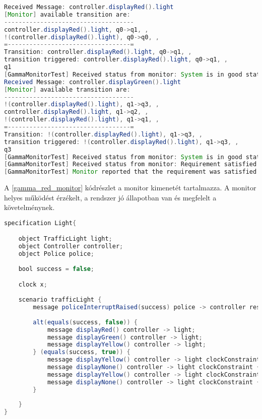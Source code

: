 \begin{lstlisting}[language=java, frame=single, float=ht!, caption={Monitor kimenete.},captionpos=b,label=gamma_red_monitor]
Received Message: controller.displayRed().light
[Monitor] available transition are: 
------------------------------------
controller.displayRed().light, q0->q1, , 
!(controller.displayRed().light), q0->q0, , 
=----------------------------------=
Transition: controller.displayRed().light, q0->q1, , 
transition triggered: controller.displayRed().light, q0->q1, , 
q1
[GammaMonitorTest] Received status from monitor: System is in good state.
Received Message: controller.displayGreen().light
[Monitor] available transition are: 
------------------------------------
!(controller.displayRed().light), q1->q3, , 
controller.displayRed().light, q1->q2, , 
!(controller.displayRed().light), q1->q1, , 
=----------------------------------=
Transition: !(controller.displayRed().light), q1->q3, , 
transition triggered: !(controller.displayRed().light), q1->q3, , 
q3
[GammaMonitorTest] Received status from monitor: System is in good state.
[GammaMonitorTest] Received status from monitor: Requirement satisfied
[GammaMonitorTest] Monitor reported that the requirement was satisfied
\end{lstlisting}

A \ref{gamma_red_monitor} kódrészlet a monitor kimenetét tartalmazza.
A monitor helyes működést érzékelt, a rendszer jó állapotban van és megfelelt a követelménynek.

\begin{lstlisting}[language=java, frame=single, float=ht!, caption={Második \textit{Gamma} szcenárió szöveges leírása.},captionpos=b,label=gamma_complex_scenario]
specification Light{

    object TrafficLight light;
    object Controller controller;
    object Police police;
    
    bool success = false;

    clock x;
    
    scenario trafficLight {
        message policeInterruptRaised(success) police -> controller reset x;
        
        alt(equals(success, false)) {
            message displayRed() controller -> light;
            message displayGreen() controller -> light;
            message displayYellow() controller -> light;
        } (equals(success, true)) {
            message displayYellow() controller -> light clockConstraint {>=(x,1)} reset x;
            message displayNone() controller -> light clockConstraint {>=(x,1)} reset x;
            message displayYellow() controller -> light clockConstraint {>=(x,1)} reset x;
            message displayNone() controller -> light clockConstraint {>=(x,1)};
        }
        
    }
}
\end{lstlisting}

